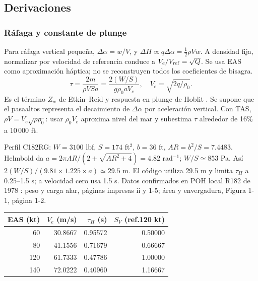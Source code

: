 \subsection{Derivaciones}


\subsubsection{Ráfaga y constante de plunge}
Para ráfaga vertical pequeña, $\Delta\alpha=w/V$, y $\Delta H\propto q\Delta\alpha=\tfrac12\rho Vw$. A densidad fija, normalizar por velocidad de referencia conduce a $V_e/V_{\rm ref}=\sqrt Q$. Se usa EAS como aproximación háptica; no se reconstruyen todos los coeficientes de bisagra.
\begin{equation}
\tau=\frac{2m}{\rho VSa}=\frac{2(W/S)}{g\rho_0aV_e},\quad V_e=\sqrt{2q/\rho_0}.
\end{equation}
Es el término $Z_w$ de Etkin--Reid \cite{etkin1996} y respuesta en plunge de Hoblit \cite{hoblit1988}. Se supone que el pasaaltos representa el decaimiento de $\Delta\alpha$ por aceleración vertical. Con TAS, $\rho V=V_e\sqrt{\rho\rho_0}$: usar $\rho_0V_e$ aproxima nivel del mar y subestima $\tau$ alrededor de 16\% a 10\,000 ft.

Perfil C182RG: $W=3100$ lbf, $S=174$ ft$^2$, $b=36$ ft, $AR=b^2/S=7.4483$. Helmbold da $a=2\pi AR/(2+\sqrt{AR^2+4})=4.82$ rad$^{-1}$; $W/S\simeq853$ Pa. Así $2(W/S)/(9.81\times1.225\times a)\simeq29.5$ m. El código utiliza 29.5 m y limita $\tau_H$ a 0.25--1.5 s; a velocidad cero usa 1.5 s. Datos confirmados en POH local R182 de 1978 \cite{poh182}: peso y carga alar, páginas impresas ii y 1-5; área y envergadura, Figura 1-1, página 1-2.
\begin{center}\begin{tabular}{rrrr}\toprule EAS (kt)&$V_e$ (m/s)&$\tau_H$ (s)&$S_V$ (ref.120 kt)\\\midrule
60&30.8667&0.95572&0.50000\\80&41.1556&0.71679&0.66667\\120&61.7333&0.47786&1.00000\\140&72.0222&0.40960&1.16667\\\bottomrule\end{tabular}\end{center}



